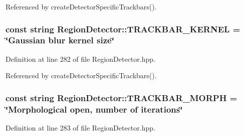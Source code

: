 \-Referenced by create\-Detector\-Specific\-Trackbars().

\hypertarget{classmultiscale_1_1analysis_1_1RegionDetector_a79b72da59c92b368fb7894fe1f424e00}{
\subsubsection[{\-T\-R\-A\-C\-K\-B\-A\-R\-\_\-\-K\-E\-R\-N\-E\-L}]{\setlength{\rightskip}{0pt plus 5cm}const string {\bf \-Region\-Detector\-::\-T\-R\-A\-C\-K\-B\-A\-R\-\_\-\-K\-E\-R\-N\-E\-L} = \char`\"{}\-Gaussian blur kernel size\char`\"{}}}\label{classmultiscale_1_1analysis_1_1RegionDetector_a79b72da59c92b368fb7894fe1f424e00}


\-Definition at line 282 of file \-Region\-Detector.\-hpp.



\-Referenced by create\-Detector\-Specific\-Trackbars().

\hypertarget{classmultiscale_1_1analysis_1_1RegionDetector_a0358affd40f13327b10447b7fe938338}{
\subsubsection[{\-T\-R\-A\-C\-K\-B\-A\-R\-\_\-\-M\-O\-R\-P\-H}]{\setlength{\rightskip}{0pt plus 5cm}const string {\bf \-Region\-Detector\-::\-T\-R\-A\-C\-K\-B\-A\-R\-\_\-\-M\-O\-R\-P\-H} = \char`\"{}\-Morphological open, number of iterations\char`\"{}}}\label{classmultiscale_1_1analysis_1_1RegionDetector_a0358affd40f13327b10447b7fe938338}


\-Definition at line 283 of file \-Region\-Detector.\-hpp.



